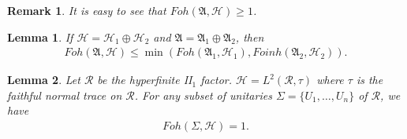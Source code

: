 \documentclass[a4paper,10pt]{amsart}
\newtheorem{lemma}{Lemma}[section]
\newtheorem{remark}{Remark}[section]
\newcommand{\AAA}{\mathfrak A}
\newcommand{\HHH}{\mathscr H} %
\newcommand{\RR}{\mathcal R}
\begin{document}
\begin{remark}
    It is easy to see that $Foh(\AAA, \HHH) \geq 1$. 
\end{remark}

\begin{lemma}
    If $\HHH = \HHH_1 \oplus \HHH_2$ and $\AAA = \AAA_{1} \oplus \AAA_2$, then
    \begin{align*}
        Foh(\AAA, \HHH) \leq \min(Foh(\AAA_1, \HHH_1), Foin h(\AAA_2, \HHH_2)). 
    \end{align*}
\end{lemma}

\begin{lemma}
    Let $\RR$ be the hyperfinite II$_1$ factor. $\HHH = L^{2}(\RR, \tau)$ where
    $\tau$ is the faithful normal trace on $\RR$. For any subset of unitaries 
    $\Sigma = \{U_1, \ldots, U_n\}$ of $\RR$,
    we have
    \begin{align*}
        Foh(\Sigma, \HHH) = 1. 
    \end{align*}
\end{lemma}
\end{document}
